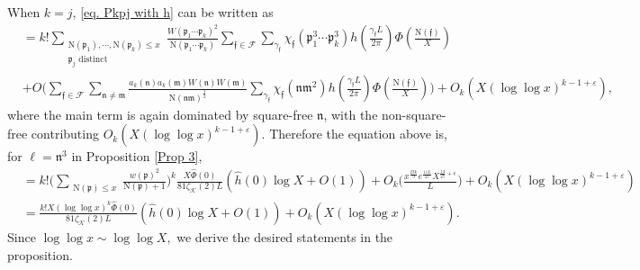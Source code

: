 \documentclass[11pt]{amsart}
\def\p{\mathfrak{p}}
\def\n{\mathfrak{n}}
\def\m{\mathfrak{m}}
\newcommand{\norm}{\mathrm{N}}
\newcommand{\cond}{\mathrm{cond}}
\numberwithin{equation}{section}
\theoremstyle{remark}
\newcommand{\pj}[1]{{\color{blue} \sf  PJ: #1}}
\begin{document}
When $k=j$, \eqref{eq. Pkpj with h} can be written as
\begin{align*}
&=
k!
\sum_{\substack{ \norm(\p_1),\cdots, \norm(\p_k)\leq x\\\text{$\p_j$ distinct}}}\frac{W(\p_1\cdots \p_k)^2} {\norm(\p_1\cdots \p_k)} \sum_{\mathfrak{f}\in\mathcal{F}} 
    \sum_{\gamma_\mathfrak{f}} 
     \chi_\mathfrak{f}(\p_1^3\cdots\p_k^3)h\left(\frac{\gamma_\mathfrak{f} L}{2\pi}\right) \Phi\left(\frac{\norm(\mathfrak{f})}{X}\right)
\\
& +O\bigg( 
\sum_{\mathfrak{f}\in\mathcal{F}}  \sum_{\n\neq\m} \frac{ a_{k}(\n)a_{k}(\m)W(\n)W(\m)}{\norm(\n\m)^{\frac{1}{2}}}  
\sum_{\gamma_\mathfrak{f}} \chi_\mathfrak{f}(\n\m^2)h\left(\frac{\gamma_\mathfrak{f} L}{2\pi}\right) \Phi\left(\frac{\norm(\mathfrak{f})}{X}\right)\bigg)
+
O_{k}(X(\log\log x)^{k-1+\varepsilon}),
\end{align*}
where the main term is again dominated by square-free $\n$, with the non-square-free contributing $O_{k}(X(\log\log x)^{k-1+\varepsilon}).$ 
Therefore the equation above is, for $\ell=\n^3$ in Proposition \ref{Prop 3},
\begin{align*}
    &=
    k!
    \bigg(\sum_{\substack{ \norm(\p)\leq x}}\frac{w(\p)^2} {\norm(\p)+1}\bigg)^k 
    \frac{X\widehat{\Phi}(0)}{81\zeta_\mathcal{K}(2)L}    
    \left(\hat{h}(0) \log X 
    + 
    O(1)\right)
    +
    O_k\bigg(\frac{x^{\frac{23k}{9}}e^{\frac{11L}{27}}X^{\frac{14}{27}+\epsilon}}{L}\bigg)
    +
    O_{k}(X(\log\log x)^{k-1+\varepsilon})
    \\
    &=
    \frac{k!X(\log\log x)^k\widehat{\Phi}(0)}{81\zeta_\mathcal{K}(2)L}  
    \left(\hat{h}(0) \log X 
    +     O(1)\right) 
    +    O_{k}(X(\log\log x)^{k-1+\varepsilon}).
\end{align*}
Since $\log \log x \sim  \log \log X,$
we derive the desired statements in the proposition.


\end{document}
